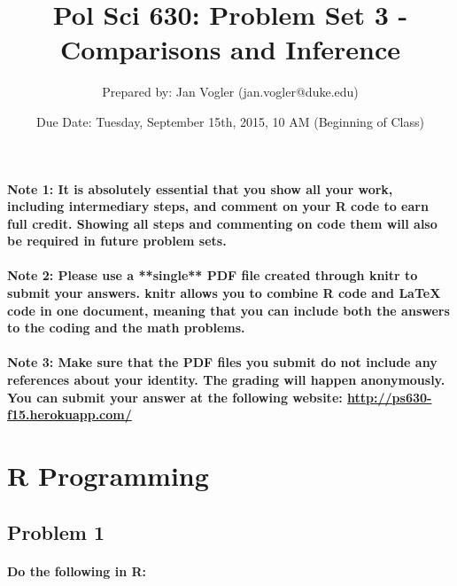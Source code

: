 \documentclass[12pt,letter]{article}
\begin{document}
\title{Pol Sci 630: Problem Set 3 - Comparisons and Inference}

\author{Prepared by: Jan Vogler (jan.vogler@duke.edu)}

\date{Due Date: Tuesday, September 15th, 2015, 10 AM (Beginning of Class)}
 
\maketitle 



\paragraph{Note 1: It is absolutely essential that you show all your work, including intermediary steps, and comment on your R code to earn full credit. Showing all steps and commenting on code them will also be required in future problem sets.}

\paragraph{Note 2: Please use a **single** PDF file created through knitr to submit your answers. knitr allows you to combine R code and LaTeX code in one document, meaning that you can include both the answers to the coding and the math problems.}

\paragraph{Note 3: Make sure that the PDF files you submit do not include any references about your identity. The grading will happen anonymously. You can submit your answer at the following website: \url{http://ps630-f15.herokuapp.com/}}



\section*{R Programming}

\subsection*{Problem 1}

\paragraph{Do the following in R:}
\end{document}
